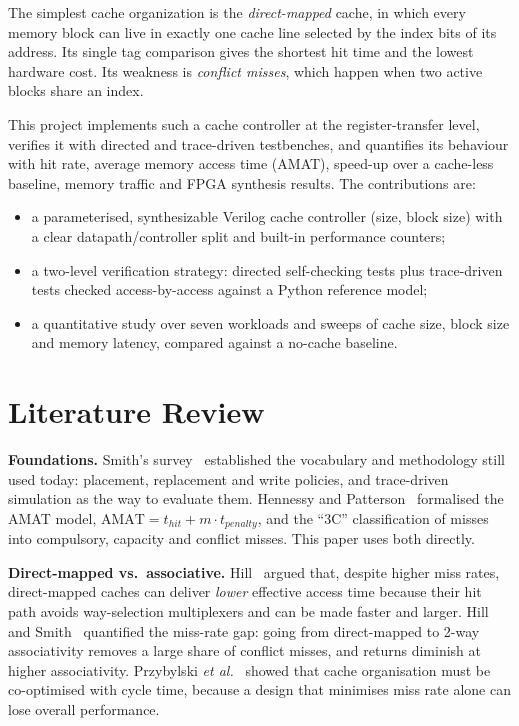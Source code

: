 \documentclass[conference]{IEEEtran}
\begin{document}
The simplest cache organization is the \emph{direct-mapped} cache, in which every memory
block can live in exactly one cache line selected by the index bits of its address. Its
single tag comparison gives the shortest hit time and the lowest hardware cost. Its
weakness is \emph{conflict misses}, which happen when two active blocks share an index.

This project implements such a cache controller at the register-transfer level, verifies it
with directed and trace-driven testbenches, and quantifies its behaviour with hit rate,
average memory access time (AMAT), speed-up over a cache-less baseline, memory traffic and
FPGA synthesis results. The contributions are:
\begin{itemize}
  \item a parameterised, synthesizable Verilog cache controller (size, block size) with a
        clear datapath/controller split and built-in performance counters;
  \item a two-level verification strategy: directed self-checking tests plus trace-driven
        tests checked access-by-access against a Python reference model;
  \item a quantitative study over seven workloads and sweeps of cache size, block size and
        memory latency, compared against a no-cache baseline.
\end{itemize}

\section{Literature Review}
\textbf{Foundations.} Smith's survey~\cite{smith1982} established the vocabulary and
methodology still used today: placement, replacement and write policies, and
trace-driven simulation as the way to evaluate them. Hennessy and Patterson~\cite{hp_quant}
formalised the AMAT model,
$\text{AMAT} = t_{hit} + m \cdot t_{penalty}$,
and the ``3C'' classification of misses into compulsory, capacity and conflict misses.
This paper uses both directly.

\textbf{Direct-mapped vs.\ associative.} Hill~\cite{hill1988} argued that, despite higher miss rates,
direct-mapped caches can deliver \emph{lower} effective access time because their hit path
avoids way-selection multiplexers and can be made faster and larger. Hill and
Smith~\cite{hill1989} quantified the miss-rate gap: going from direct-mapped to 2-way
associativity removes a large share of conflict misses, and returns diminish at higher
associativity. Przybylski \emph{et al.}~\cite{przybylski1988,przybylski1990} showed that cache
organisation must be co-optimised with cycle time, because a design that minimises miss rate
alone can lose overall performance.
\end{document}
